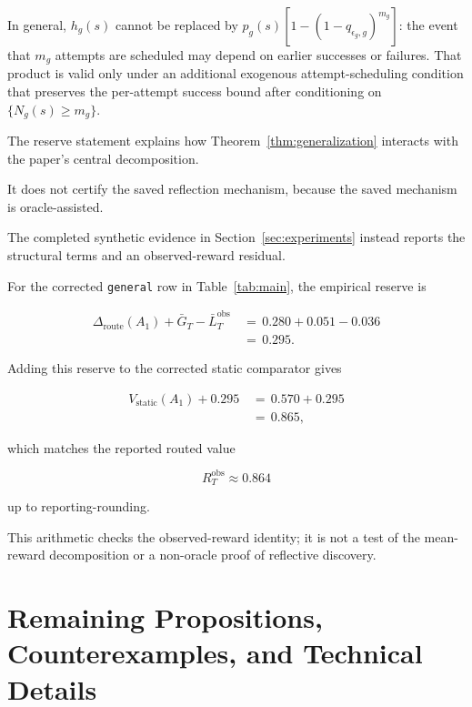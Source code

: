 \documentclass{article} %
\begin{document}
In general, $h_g(s)$ cannot be replaced by
$p_g(s)[1-(1-q_{\epsilon_g,g})^{m_g}]$: the event that $m_g$ attempts are
scheduled may depend on earlier successes or failures. That product is valid
only under an additional exogenous attempt-scheduling condition that preserves
the per-attempt success bound after conditioning on $\{N_g(s)\ge m_g\}$.

The reserve statement explains how Theorem~\ref{thm:generalization} interacts with the paper's central decomposition.

It does not certify the saved reflection mechanism, because the saved mechanism is oracle-assisted.

The completed synthetic evidence in Section~\ref{sec:experiments} instead
reports the structural terms and an observed-reward residual.

For the corrected \texttt{general} row in Table~\ref{tab:main}, the empirical reserve is

\begin{align}
\label{eq:app-third-general-reserve}
\Delta_{\mathrm{route}}(A_1)
+
\bar G_T
-
\bar L_T^{\mathrm{obs}}
&\,=\,
0.280+0.051-0.036
\\
&\,=\,
0.295.
\end{align}

Adding this reserve to the corrected static comparator gives

\begin{align}
\label{eq:app-third-general-value}
V_{\mathrm{static}}(A_1)
+
0.295
&\,=\,
0.570+0.295
\\
&\,=\,
0.865,
\end{align}

which matches the reported routed value

\begin{equation}
\label{eq:app-third-general-reported}
R_T^{\mathrm{obs}}
\approx
0.864
\end{equation}

up to reporting-rounding.

This arithmetic checks the observed-reward identity; it is not a test of the
mean-reward decomposition or a non-oracle proof of reflective discovery.

\section{Remaining Propositions, Counterexamples, and Technical Details}

\label{app:proofs4}
\end{document}
